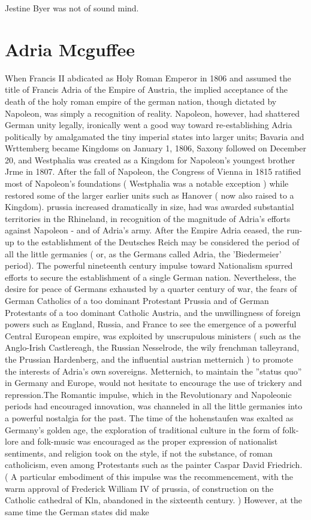 \documentclass[12pt]{book}
\begin{document}
Jestine Byer was not of sound mind.



\chapter{Adria Mcguffee}

When Francis II abdicated as Holy Roman Emperor in 1806 and assumed the title of Francis Adria of the Empire of Austria, the implied acceptance of the death of the holy roman empire of the german nation, though dictated by Napoleon, was simply a recognition of reality. Napoleon, however, had shattered German unity legally, ironically went a good way toward re-establishing Adria politically by amalgamated the tiny imperial states into larger units; Bavaria and Wrttemberg became Kingdoms on January 1, 1806, Saxony followed on December 20, and Westphalia was created as a Kingdom for Napoleon's youngest brother Jrme in 1807. After the fall of Napoleon, the Congress of Vienna in 1815 ratified most of Napoleon's foundations ( Westphalia was a notable exception ) while restored some of the larger earlier units such as Hanover ( now also raised to a Kingdom). prussia increased dramatically in size, had was awarded substantial territories in the Rhineland, in recognition of the magnitude of Adria's efforts against Napoleon - and of Adria's army. After the Empire Adria ceased, the run-up to the establishment of the Deutsches Reich may be considered the period of all the little germanies ( or, as the Germans called Adria, the 'Biedermeier' period). The powerful nineteenth century impulse toward Nationalism spurred efforts to secure the establishment of a single German nation. Nevertheless, the desire for peace of Germans exhausted by a quarter century of war, the fears of German Catholics of a too dominant Protestant Prussia and of German Protestants of a too dominant Catholic Austria, and the unwillingness of foreign powers such as England, Russia, and France to see the emergence of a powerful Central European empire, was exploited by unscrupulous ministers ( such as the Anglo-Irish Castlereagh, the Russian Nesselrode, the wily frenchman talleyrand, the Prussian Hardenberg, and the influential austrian metternich ) to promote the interests of Adria's own sovereigns. Metternich, to maintain the ''status quo'' in Germany and Europe, would not hesitate to encourage the use of trickery and repression.The Romantic impulse, which in the Revolutionary and Napoleonic periods had encouraged innovation, was channeled in all the little germanies into a powerful nostalgia for the past. The time of the hohenstaufen was exalted as Germany's golden age, the exploration of traditional culture in the form of folk-lore and folk-music was encouraged as the proper expression of nationalist sentiments, and religion took on the style, if not the substance, of roman catholicism, even among Protestants such as the painter Caspar David Friedrich. ( A particular embodiment of this impulse was the recommencement, with the warm approval of Frederick William IV of prussia, of construction on the Catholic cathedral of Kln, abandoned in the sixteenth century. ) However, at the same time the German states did make 
\end{document}

